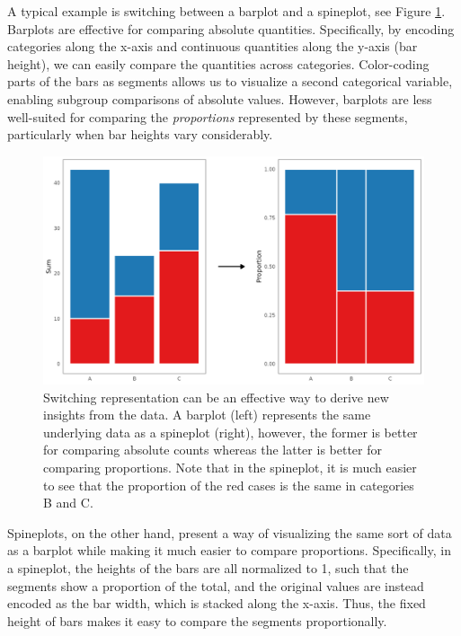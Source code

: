 \documentclass[
]{book}
\begin{document}
A typical example is switching between a barplot and a spineplot, see Figure \ref{fig:barplot-spineplot1}. Barplots are effective for comparing absolute quantities. Specifically, by encoding categories along the x-axis and continuous quantities along the y-axis (bar height), we can easily compare the quantities across categories. Color-coding parts of the bars as segments allows us to visualize a second categorical variable, enabling subgroup comparisons of absolute values. However, barplots are less well-suited for comparing the \emph{proportions} represented by these segments, particularly when bar heights vary considerably.

\begin{figure}

{\centering \includegraphics[width=20.83in]{./figures/barplot-spineplot} 

}

\caption{Switching representation can be an effective way to derive new insights from the data. A barplot (left) represents the same underlying data as a spineplot (right), however, the former is better for comparing absolute counts whereas the latter is better for comparing proportions. Note that in the spineplot, it is much easier to see that the proportion of the red cases is the same in categories B and C.}\label{fig:barplot-spineplot1}
\end{figure}

Spineplots, on the other hand, present a way of visualizing the same sort of data as a barplot while making it much easier to compare proportions. Specifically, in a spineplot, the heights of the bars are all normalized to 1, such that the segments show a proportion of the total, and the original values are instead encoded as the bar width, which is stacked along the x-axis. Thus, the fixed height of bars makes it easy to compare the segments proportionally.
\end{document}
